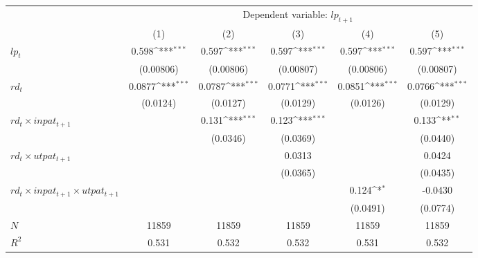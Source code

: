 {
\def\sym#1{\ifmmode^{#1}\else\(^{#1}\)\fi}
\begin{tabular}{l*{5}{c}}
\hline\hline
           &\multicolumn{5}{c}{Dependent variable: $lp_{t+1}$} \\\cmidrule{2-6}
            &\multicolumn{1}{c}{(1)}&\multicolumn{1}{c}{(2)}&\multicolumn{1}{c}{(3)}&\multicolumn{1}{c}{(4)}&\multicolumn{1}{c}{(5)}\\

\hline
$lp_{t}$        &       0.598\sym{***}&       0.597\sym{***}&       0.597\sym{***}&       0.597\sym{***}&       0.597\sym{***}\\
            &   (0.00806)         &   (0.00806)         &   (0.00807)         &   (0.00806)         &   (0.00807)         \\
$rd_{t}$      &      0.0877\sym{***}&      0.0787\sym{***}&      0.0771\sym{***}&      0.0851\sym{***}&      0.0766\sym{***}\\
            &    (0.0124)         &    (0.0127)         &    (0.0129)         &    (0.0126)         &    (0.0129)         \\
$rd_{t}\times inpat_{t+1}$        &                     &       0.131\sym{***}&       0.123\sym{***}&                     &       0.133\sym{**} \\
            &                     &    (0.0346)         &    (0.0369)         &                     &    (0.0440)         \\
$rd_{t}\times utpat_{t+1}$        &                     &                     &      0.0313         &                     &      0.0424         \\
            &                     &                     &    (0.0365)         &                     &    (0.0435)         \\
$rd_{t}\times inpat_{t+1} \times utpat_{t+1} $     &                     &                     &                     &       0.124\sym{*}  &     -0.0430         \\
            &                     &                     &                     &    (0.0491)         &    (0.0774)         \\
\hline
\(N\)       &       11859         &       11859         &       11859         &       11859         &       11859         \\
\(R^{2}\)   &       0.531         &       0.532         &       0.532         &       0.531         &       0.532         \\
\hline\hline
\end{tabular}
}
